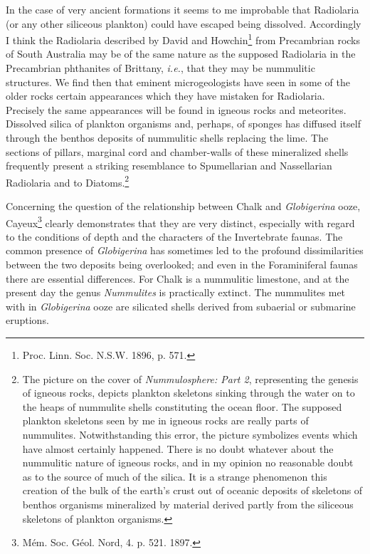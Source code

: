 \documentclass[a4paper, 12pt, oneside]{article}
\begin{document}
In the case of very ancient formations it seems to me improbable that Radiolaria (or any other siliceous plankton) could have escaped being dissolved. Accordingly I think the Radiolaria described by David and Howchin\footnote{Proc. Linn. Soc. N.S.W. 1896, p. 571.} from Precambrian rocks of South Australia may be of the same nature as the supposed Radiolaria in the Precambrian phthanites of Brittany, \emph{i.e.}, that they may be nummulitic structures. We find then that eminent microgeologists have seen in some of the older rocks certain appearances which they have mistaken for Radiolaria. Precisely the same appearances will be found in igneous rocks and meteorites. Dissolved silica of plankton organisms and, perhaps, of sponges has diffused itself through the benthos deposits of nummulitic shells replacing the lime. The sections of pillars, marginal cord and chamber-walls of these mineralized shells frequently present a striking resemblance to Spumellarian and Nassellarian Radiolaria and to Diatoms.\footnote{The picture on the cover of \emph{Nummulosphere: Part 2}, representing the genesis of igneous rocks, depicts plankton skeletons sinking through the water on to the heaps of nummulite shells constituting the ocean floor. The supposed plankton skeletons seen by me in igneous rocks are really parts of nummulites. Notwithstanding this error, the picture symbolizes events which have almost certainly happened. There is no doubt whatever about the nummulitic nature of igneous rocks, and in my opinion no reasonable doubt as to the source of much of the silica. It is a strange phenomenon this creation of the bulk of the earth's crust out of oceanic deposits of skeletons of benthos organisms mineralized by material derived partly from the siliceous skeletons of plankton organisms.}

Concerning the question of the relationship between Chalk and \emph{Globigerina} ooze, Cayeux\footnote{Mém. Soc. Géol. Nord, 4. p. 521. 1897.} clearly demonstrates that they are very distinct, especially with regard to the conditions of depth and the characters of the Invertebrate faunas. The common presence of \emph{Globigerina} has sometimes led to the profound dissimilarities between the two deposits being overlooked; and even in the Foraminiferal faunas there are essential differences. For Chalk is a nummulitic limestone, and at the present day the genus \emph{Nummulites} is practically extinct. The nummulites met with in \emph{Globigerina} ooze are silicated shells derived from subaerial or submarine eruptions.
\end{document}
